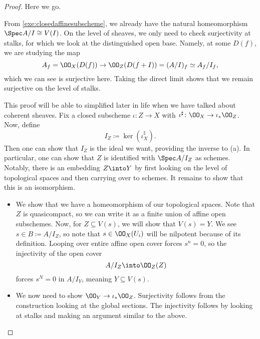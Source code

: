 \documentclass[../notes.tex]{subfiles}
\begin{document}
\begin{proof}
	Here we go.
	\begin{listalph}
		\item From \autoref{exe:closedaffinesubscheme}, we already have the natural homeomorphism $\Spec A/I\cong V(I)$. On the level of sheaves, we only need to check surjectivity at stalks, for which we look at the distinguished open base. Namely, at some $D(f)$, we are studying the map
		\[A_f=\OO_X(D(f))\to\OO_Z(D(f+I))=(A/I)_f\simeq A_f/I_f,\]
		which we can see is surjective here. Taking the direct limit shows that we remain surjective on the level of stalks.
		\item This proof will be able to simplified later in life when we have talked about coherent sheaves. Fix a closed subscheme $\iota\colon Z\to X$ with $\iota^\sharp\colon\OO_X\to\iota_*\OO_Z$. Now, define
		\[I_Z\coloneqq\ker(\iota^\sharp_X).\]
		Then one can show that $I_Z$ is the ideal we want, providing the inverse to (a). In particular, one can show that $Z$ is identified with $\Spec A/I_Z$ as schemes. Notably, there is an embedding $Z\into Y$ by first looking on the level of topological spaces and then carrying over to schemes. It remains to show that this is an isomorphism.
		\begin{itemize}
			\item We show that we have a homeomorphism of our topological spaces. Note that $Z$ is quasicompact, so we can write it as a finite union of affine open subschemes. Now, for $Z\subseteq V(s)$, we will show that $V(s)=Y$. We see $s\in B\coloneqq A/I_Z$, so note that $s\in\OO_X(U_i)$ will be nilpotent because of its definition. Looping over entire affine open cover forces $s^n=0$, so the injectivity of the open cover
			\[A/I_Z\into\OO_Z(Z)\]
			forces $s^N=0$ in $A/I_Y$, meaning $Y\subseteq V(s)$.
			\item We now need to show $\OO_Y\to\iota_*\OO_Z$. Surjectivity follows from the construction looking at the global sections. The injectivity follows by looking at stalks and making an argument similar to the above.
			\qedhere
		\end{itemize}
	\end{listalph}
\end{proof}
\end{document}
